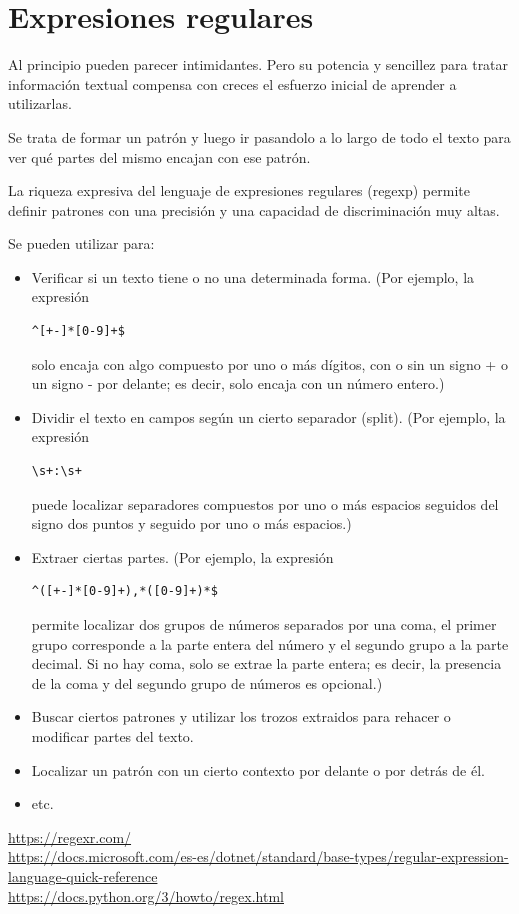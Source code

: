 \documentclass[spanish,12pt,a4paper,final,oneside]{book}
\begin{document}
\section{Expresiones regulares}
Al principio pueden parecer intimidantes. Pero su potencia y sencillez para tratar información textual compensa con creces el esfuerzo inicial de aprender a utilizarlas.

Se trata de formar un patrón y luego ir pasandolo a lo largo de todo el texto para ver qué partes del mismo encajan con ese patrón. 

La riqueza expresiva del lenguaje de expresiones regulares (regexp) permite definir patrones con una precisión y una capacidad de discriminación muy altas.

Se pueden utilizar para:
\begin{itemize}
\item Verificar si un texto tiene o no una determinada forma. (Por ejemplo, la expresión \begin{verbatim}^[+-]*[0-9]+$\end{verbatim} solo encaja con algo compuesto por uno o más dígitos, con o sin un signo + o un signo - por delante; es decir, solo encaja con un número entero.)
\item Dividir el texto en campos según un cierto separador (split). (Por ejemplo, la expresión \begin{verbatim}\s+:\s+\end{verbatim} puede localizar separadores compuestos por uno o más espacios seguidos del signo dos puntos y seguido por uno o más espacios.)
\item Extraer ciertas partes. (Por ejemplo, la expresión \begin{verbatim}^([+-]*[0-9]+),*([0-9]+)*$\end{verbatim} permite localizar dos grupos de números separados por una coma, el primer grupo corresponde a la parte entera del número y el segundo grupo a la parte decimal. Si no hay coma, solo se extrae la parte entera; es decir, la presencia de la coma y del segundo grupo de números es opcional.) 
\item Buscar ciertos patrones y utilizar los trozos extraidos para rehacer o modificar partes del texto.
\item Localizar un patrón con un cierto contexto por delante o por detrás de él.
\item etc.
\end{itemize}

\url{https://regexr.com/}
\\ \url{https://docs.microsoft.com/es-es/dotnet/standard/base-types/regular-expression-language-quick-reference}
\\ \url{https://docs.python.org/3/howto/regex.html}
\end{document}
